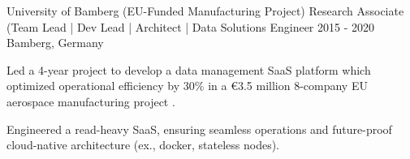 \begin{cventries}

    
        
  \cventry
    {University of Bamberg (EU-Funded Manufacturing Project)} %
    {Research Associate (Team Lead | Dev Lead | Architect | Data Solutions Engineer} %
    {2015 - 2020} %
    {Bamberg, Germany} %
    {
      \begin{cvitems} %
		\item {Led a 4-year project to develop a data management SaaS platform which optimized operational efficiency by 30\% in a €3.5 million 8-company EU aerospace manufacturing project .}
		\item {Engineered a read-heavy SaaS, ensuring seamless operations and future-proof cloud-native architecture (ex., docker, stateless nodes).}
      \end{cvitems}
    }
    







\end{cventries}
